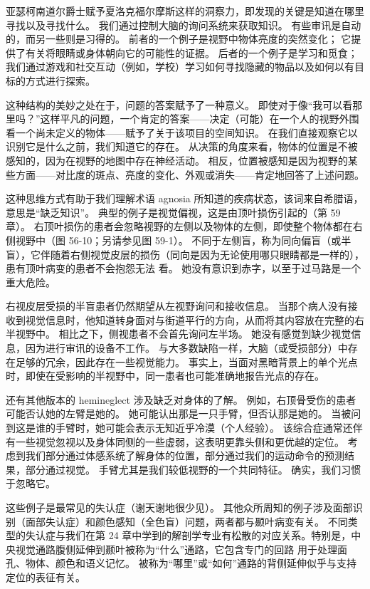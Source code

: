 亚瑟柯南道尔爵士赋予夏洛克福尔摩斯这样的洞察力，即发现的关键是知道在哪里寻找以及寻找什么。 我们通过控制大脑的询问系统来获取知识。 有些审讯是自动的，而另一些则是习得的。 前者的一个例子是视野中物体亮度的突然变化； 它提供了有关将眼睛或身体朝向它的可能性的证据。 后者的一个例子是学习和觅食； 我们通过游戏和社交互动（例如，学校）学习如何寻找隐藏的物品以及如何以有目标的方式进行探索。

这种结构的美妙之处在于，问题的答案赋予了一种意义。 即使对于像“我可以看那里吗？”这样平凡的问题，一个肯定的答案——决定（可能）在一个人的视野外围看一个尚未定义的物体——赋予了关于该项目的空间知识。 在我们直接观察它以识别它是什么之前，我们知道它的存在。 从决策的角度来看，物体的位置是不被感知的，因为在视野的地图中存在神经活动。 相反，位置被感知是因为视野的某些方面——对比度的斑点、亮度的变化、外观或消失——肯定地回答了上述问题。

这种思维方式有助于我们理解术语 agnosia 所知道的疾病状态，该词来自希腊语，意思是“缺乏知识”。 典型的例子是视觉偏视，这是由顶叶损伤引起的（第 59 章）。 右顶叶损伤的患者会忽略视野的左侧以及物体的左侧，即使整个物体都在右侧视野中（图 56-10；另请参见图 59-1）。 不同于左侧盲，称为同向偏盲（或半盲），它伴随着右侧视觉皮层的损伤（同向是因为无论使用哪只眼睛都是一样的），患有顶叶病变的患者不会抱怨无法 看。 她没有意识到赤字，以至于过马路是一个重大危险。

右视皮层受损的半盲患者仍然期望从左视野询问和接收信息。 当那个病人没有接收到视觉信息时，他知道转身面对与街道平行的方向，从而将其内容放在完整的右半视野中。 相比之下，侧视患者不会首先询问左半场。 她没有感觉到缺少视觉信息，因为进行审讯的设备不工作。 与大多数缺陷一样，大脑（或受损部分）中存在足够的冗余，因此存在一些视觉能力。 事实上，当面对黑暗背景上的单个光点时，即使在受影响的半视野中，同一患者也可能准确地报告光点的存在。

还有其他版本的 hemineglect 涉及缺乏对身体的了解。 例如，右顶骨受伤的患者可能否认她的左臂是她的。 她可能认出那是一只手臂，但否认那是她的。 当被问到这是谁的手臂时，她可能会表示无知近乎冷漠（个人经验）。 该综合症通常还伴有一些视觉忽视以及身体同侧的一些虚弱，这表明更靠头侧和更优越的定位。 考虑到我们部分通过体感系统了解身体的位置，部分通过我们的运动命令的预测结果，部分通过视觉。 手臂尤其是我们较低视野的一个共同特征。 确实，我们习惯于忽略它。

这些例子是最常见的失认症（谢天谢地很少见）。 其他众所周知的例子涉及面部识别（面部失认症）和颜色感知（全色盲）问题，两者都与颞叶病变有关。 不同类型的失认症与我们在第 24 章中学到的解剖学专业有松散的对应关系。特别是，中央视觉通路腹侧延伸到颞叶被称为“什么”通路，它包含专门的回路 用于处理面孔、物体、颜色和语义记忆。 被称为“哪里”或“如何”通路的背侧延伸似乎与支持定位的表征有关。

